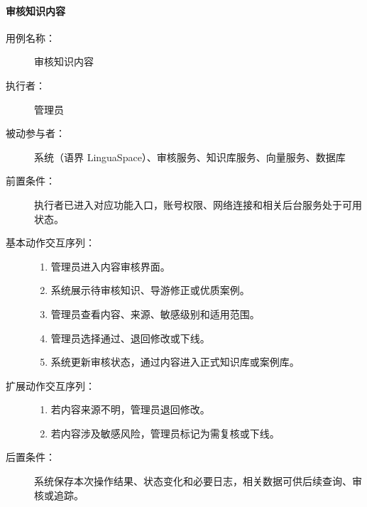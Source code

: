 \paragraph{审核知识内容}
\begin{description}
  \item[用例名称：] 审核知识内容
  \item[执行者：] 管理员
  \item[被动参与者：] 系统（语界 LinguaSpace）、审核服务、知识库服务、向量服务、数据库
  \item[前置条件：] 执行者已进入对应功能入口，账号权限、网络连接和相关后台服务处于可用状态。
  \item[基本动作交互序列：]
  \begin{enumerate}
    \item 管理员进入内容审核界面。
    \item 系统展示待审核知识、导游修正或优质案例。
    \item 管理员查看内容、来源、敏感级别和适用范围。
    \item 管理员选择通过、退回修改或下线。
    \item 系统更新审核状态，通过内容进入正式知识库或案例库。
  \end{enumerate}
  \item[扩展动作交互序列：]
  \begin{enumerate}
    \item[3a.] 若内容来源不明，管理员退回修改。
    \item[4a.] 若内容涉及敏感风险，管理员标记为需复核或下线。
  \end{enumerate}
  \item[后置条件：] 系统保存本次操作结果、状态变化和必要日志，相关数据可供后续查询、审核或追踪。
\end{description}


